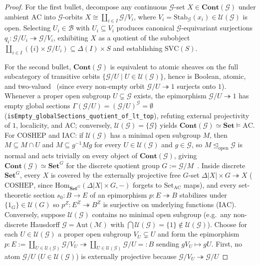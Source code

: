 \documentclass[10pt,twoside,openright]{book}
\theoremstyle{crmplain}
\theoremstyle{crmdef}
\theoremstyle{crmremark}
\begin{document}
\begin{proof}
For the first bullet, decompose any continuous $\mathcal{G}$-set $X \in \mathbf{Cont}(\mathcal{G})$ under ambient $\mathrm{AC}$ into $\mathcal{G}$-orbits $X \cong \coprod_{i \in I} \mathcal{G}/V_i$, where $V_i = \mathrm{Stab}_{\mathcal{G}}(x_i) \in \mathcal{U}(\mathcal{G})$ is open. Selecting $U_i \in \mathcal{B}$ with $U_i \subseteq V_i$ produces canonical $\mathcal{G}$-equivariant surjections $q_i : \mathcal{G}/U_i \twoheadrightarrow \mathcal{G}/V_i$, exhibiting $X$ as a quotient of the subobject $\coprod_{i \in I} (\{i\} \times \mathcal{G}/U_i) \subseteq \Delta(I) \times S$ and establishing $\mathrm{SVC}(S)$.

For the second bullet, $\mathbf{Cont}(\mathcal{G})$ is equivalent to atomic sheaves on the full subcategory of transitive orbits $\{\mathcal{G}/U \mid U \in \mathcal{U}(\mathcal{G})\}$, hence is Boolean, atomic, and two-valued~\cite[Ch.~III, \S 9]{MacLaneMoerdijk92} (since every non-empty orbit $\mathcal{G}/U \twoheadrightarrow 1$ surjects onto $1$). Whenever a proper open subgroup $U \subsetneq \mathcal{G}$ exists, the epimorphism $\mathcal{G}/U \twoheadrightarrow 1$ has empty global sections $\Gamma(\mathcal{G}/U) = (\mathcal{G}/U)^{\mathcal{G}} = \emptyset$ (\texttt{isEmpty\_\allowbreak globalSections\_\allowbreak quotient\_\allowbreak of\_\allowbreak lt\_\allowbreak top}), refuting external projectivity of $1$, localicity, and $\mathrm{AC}$; conversely, $\mathcal{U}(\mathcal{G}) = \{\mathcal{G}\}$ yields $\mathbf{Cont}(\mathcal{G}) \simeq \mathbf{Set} \models \mathrm{AC}$. For $\mathrm{COSHEP}$ and $\mathrm{IAC}$: if $\mathcal{U}(\mathcal{G})$ has a minimal open subgroup $M$, then $M \subseteq M \cap U$ and $M \subseteq g^{-1} M g$ for every $U \in \mathcal{U}(\mathcal{G})$ and $g \in \mathcal{G}$, so $M \trianglelefteq_{\mathrm{open}} \mathcal{G}$ is normal and acts trivially on every object of $\mathbf{Cont}(\mathcal{G})$, giving $\mathbf{Cont}(\mathcal{G}) \simeq \mathbf{Set}^{G}$ for the discrete quotient group $G := \mathcal{G}/M$~\cite[Thm.~6.2]{Kihara26}. Inside discrete $\mathbf{Set}^G$, every $X$ is covered by the externally projective free $G$-set $\Delta|X| \times G \twoheadrightarrow X$ ($\mathrm{COSHEP}$, since $\mathrm{Hom}_{\mathbf{Set}^G}(\Delta|X| \times G, -)$ forgets to $\mathrm{Set}_{\mathrm{AC}}$ maps), and every set-theoretic section $s_0 : B \to E$ of an epimorphism $p : E \twoheadrightarrow B$ stabilizes under $\{1_G\} \in \mathcal{U}(G)$ so $p^Z : E^Z \twoheadrightarrow B^Z$ is surjective on underlying functions ($\mathrm{IAC}$). Conversely, suppose $\mathcal{U}(\mathcal{G})$ contains no minimal open subgroup (e.g.\ any non-discrete Hausdorff $\mathcal{G} = \mathrm{Aut}(\mathcal{M})$ with $\bigcap \mathcal{U}(\mathcal{G}) = \{1\} \notin \mathcal{U}(\mathcal{G})$). Choose for each $U \in \mathcal{U}(\mathcal{G})$ a proper open subgroup $V_U \subsetneq U$ and form the epimorphism $p : E := \coprod_{U \in \mathcal{U}(\mathcal{G})} \mathcal{G}/V_U \twoheadrightarrow \coprod_{U \in \mathcal{U}(\mathcal{G})} \mathcal{G}/U =: B$ sending $g V_U \mapsto g U$. First, no atom $\mathcal{G}/U$ ($U \in \mathcal{U}(\mathcal{G})$) is externally projective because $\mathcal{G}/V_U \twoheadrightarrow \mathcal{G}/U$ 
\end{proof}
\end{document}
